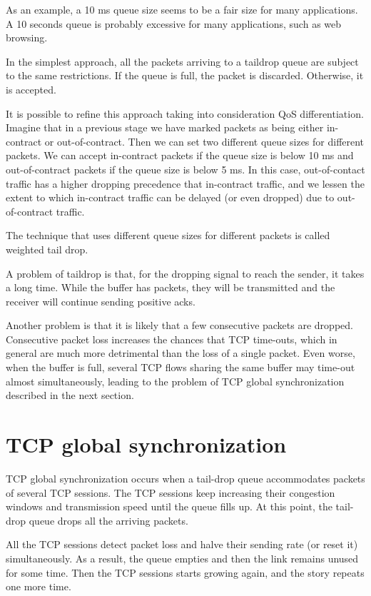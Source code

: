 As an example, a 10 ms queue size seems to be a fair size for many applications.
A 10 seconds queue is probably excessive for many applications, such as web browsing.

In the simplest approach, all the packets arriving to a taildrop queue are subject to the same restrictions.
If the queue is full, the packet is discarded.
Otherwise, it is accepted.

It is possible to refine this approach taking into consideration QoS differentiation.
Imagine that in a previous stage we have marked packets as being either in-contract or out-of-contract.
Then we can set two different queue sizes for different packets.
We can accept in-contract packets if the queue size is below 10 ms and out-of-contract packets if the queue size is below 5 ms.
In this case, out-of-contact traffic has a higher dropping precedence that in-contract traffic, and we lessen the extent to which in-contract traffic can be delayed (or even dropped) due to out-of-contract traffic.

The technique that uses different queue sizes for different packets is called weighted tail drop.

A problem of taildrop is that, for the dropping signal to reach the sender, it takes a long time.
While the buffer has packets, they will be transmitted and the receiver will continue sending positive acks.

Another problem is that it is likely that a few consecutive packets are dropped.
Consecutive packet loss increases the chances that TCP time-outs, which in general are much more detrimental than the loss of a single packet.
Even worse, when the buffer is full, several TCP flows sharing the same buffer may time-out almost simultaneously, leading to the problem of TCP global synchronization described in the next section.

\section{TCP global synchronization}

TCP global synchronization occurs when a tail-drop queue accommodates packets of several TCP sessions.
The TCP sessions keep increasing their congestion windows and transmission speed until the queue fills up.
At this point, the tail-drop queue drops all the arriving packets.

All the TCP sessions detect packet loss and halve their sending rate (or reset it) simultaneously.
As a result, the queue empties and then the link remains unused for some time.
Then the TCP sessions starts growing again, and the story repeats one more time.

